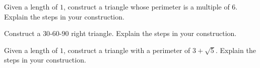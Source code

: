 \documentclass[nooutcomes]{ximera}
\begin{document}
\begin{problem}
Given a length of $1$, construct a triangle whose perimeter is a
  multiple of $6$. Explain the steps in your construction.
\end{problem}

\begin{problem}
Construct a $30$-$60$-$90$ right triangle. Explain the steps in your
  construction.
\end{problem}

\begin{problem}
Given a length of $1$, construct a triangle with a perimeter of
  $3 + \sqrt{5}$. Explain the steps in your construction.
\end{problem}
\end{document}
